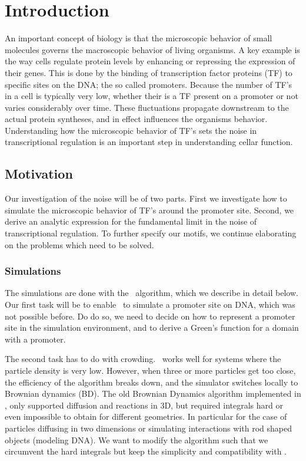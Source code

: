 \section{Introduction}

An important concept of biology is that the microscopic behavior of small molecules governs the macroscopic behavior of living organisms. A key example is the way cells regulate protein levels by enhancing or repressing the expression of their genes. This is done by the binding of transcription factor proteins (TF) to specific sites on the DNA; the so called promoters. Because the number of TF's in a cell is typically very low, whether their is a TF present on a promoter or not varies considerably over time. These fluctuations propagate downstream to the actual protein syntheses, and in effect influences the organisms behavior. Understanding how the microscopic behavior of TF's sets the noise in transcriptional regulation is an important step in understanding cellar function.

\subsection{Motivation}
Our investigation of the noise will be of two parts. First we investigate how to simulate the microscopic behavior of TF's around the promoter site. Second, we derive an analytic expression for the fundamental limit in the noise of transcriptional regulation. To further specify our motifs, we continue elaborating on the problems which need to be solved.

\subsubsection{Simulations}
The simulations are done with the \GFRD\, algorithm, which we describe in detail below. Our first task will be to enable \GFRD\, to simulate a promoter site on DNA, which was not possible before. Do do so, we need to decide on how to represent a promoter site in the simulation environment, and to derive a Green's function for a domain with a promoter. 

The second task has to do with crowding. \GFRD\, works well for systems where the particle density is very low. However, when three or more particles get too close, the efficiency of the algorithm breaks down, and the simulator switches locally to Brownian dynamics (BD). The old Brownian Dynamics algorithm implemented in \GFRD \cite{Morelli2008a}, only supported diffusion and reactions in 3D, but required integrals hard or even impossible to obtain for different geometries. In particular for the case of particles diffusing in two dimensions or simulating interactions with rod shaped objects (modeling DNA). We want to modify the algorithm such that we circumvent the hard integrals but keep the simplicity and compatibility with \GFRD.

